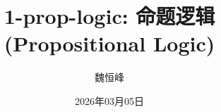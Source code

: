 \documentclass[handout]{beamer}
\title[1-prop-logic: 命题逻辑]{1-prop-logic: 命题逻辑 (Propositional Logic)}
\author[魏恒峰]{\large 魏恒峰}
\institute{hfwei@hnu.edu.cn}
\date{2026年03月05日}
\begin{document}
\maketitle

% 




\thankyou{}

\end{document}
